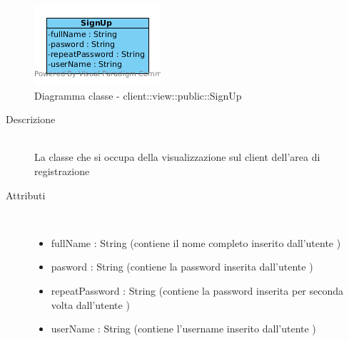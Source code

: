 \vspace{0.5cm}
\hypertarget{client::view::public::SignUp}{}
\begin{center}
			\begin{figure}[H]
				\centering \includegraphics[scale=4, max width=\textwidth, max height=\myheight]{../img/diagrammiClassi/client/view/public/SignUp.png}
				\caption{Diagramma classe - client::view::public::SignUp}
			\end{figure}
		\end{center}\begin{description}
\item[Descrizione] \hfill \\
 La classe che si occupa della visualizzazione sul client dell'area di registrazione
\item[Attributi] \hfill \\
 \vspace{-7mm}
\begin{itemize}
\item fullName : String (contiene il nome completo inserito dall'utente )
\item pasword : String (contiene la password inserita dall'utente )
\item repeatPassword : String (contiene la password inserita per seconda volta dall'utente )
\item userName : String (contiene l'username inserito dall'utente )
\end{itemize}

\end{description}

\vspace{0.5cm}
